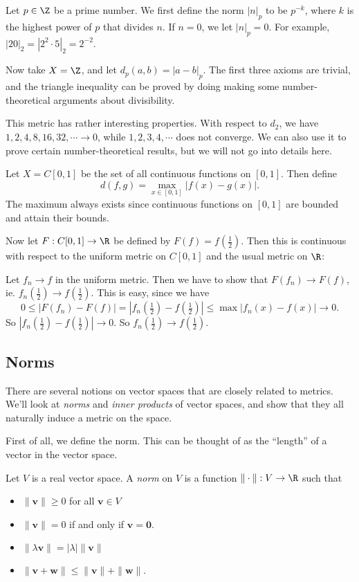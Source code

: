\documentclass[a4paper]{article}
\begin{document}
\begin{eg}
  Let $p\in \Z$ be a prime number. We first define the norm $|n|_p$ to be $p^{-k}$, where $k$ is the highest power of $p$ that divides $n$. If $n = 0$, we let $|n|_p = 0$. For example, $|20|_2 = |2^2\cdot 5|_2 = 2^{-2}$.
 
  Now take $X = \Z$, and let $d_p (a, b) = |a - b|_p$. The first three axioms are trivial, and the triangle inequality can be proved by doing making some number-theoretical arguments about divisibility.
  
  This metric has rather interesting properties. With respect to $d_2$, we have $1, 2, 4, 8, 16, 32, \cdots \to 0$, while $1, 2, 3, 4, \cdots$ does not converge. We can also use it to prove certain number-theoretical results, but we will not go into details here.
\end{eg}

\begin{eg}
  Let $X = C[0, 1]$ be the set of all continuous functions on $[0, 1]$. Then define
  \[
    d(f, g) = \max_{x\in [0, 1]}|f(x) - g(x)|.
  \]
  The maximum always exists since continuous functions on $[0, 1]$ are bounded and attain their bounds.

  Now let $F: C[0, 1] \to \R$ be defined by $F(f) = f(\frac{1}{2})$. Then this is continuous with respect to the uniform metric on $C[0, 1]$ and the usual metric on $\R$:

  Let $f_n \to f$ in the uniform metric. Then we have to show that $F(f_n) \to F(f)$, ie. $f_n(\frac{1}{2}) \to f(\frac{1}{2})$. This is easy, since we have
  \[
    0 \leq |F(f_n) - F(f)| = |f_n(\tfrac{1}{2}) - f(\tfrac{1}{2})| \leq \max|f_n(x) - f(x)| \to 0.
  \]
  So $|f_n(\frac{1}{2}) - f(\frac{1}{2})| \to 0$. So $f_n(\frac{1}{2}) \to f(\frac{1}{2})$.
\end{eg}

\subsection{Norms}
There are several notions on vector spaces that are closely related to metrics. We'll look at \emph{norms} and \emph{inner products} of vector spaces, and show that they all naturally induce a metric on the space.

First of all, we define the norm. This can be thought of as the ``length'' of a vector in the vector space.
\begin{defi}[Norm]
  Let $V$ is a real vector space. A \emph{norm} on $V$ is a function $\|\cdot \|: V\to \R$ such that
  \begin{itemize}
    \item $\|\mathbf{v}\| \geq 0$ for all $\mathbf{v}\in V$
    \item $\|\mathbf{v}\| = 0$ if and only if $\mathbf{v} = \mathbf{0}$.
    \item $\|\lambda \mathbf{v}\| = |\lambda|\|\mathbf{v}\|$
    \item $\|\mathbf{v} + \mathbf{w}\| \leq \|\mathbf{v}\| + \|\mathbf{w}\|$.
  \end{itemize}
\end{defi}
\end{document}
